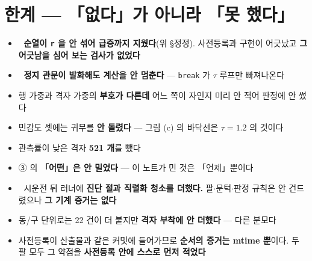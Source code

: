 \documentclass{article}
\begin{document}
\section{한계 --- 「없다」가 아니라 「못 했다」}

\begin{itemize}
\item 🔴 \textbf{순열이 \texttt{r} 을 안 섞어 급증까지 지웠다}(위 §정정).
      사전등록과 구현이 어긋났고 \textbf{그 어긋남을 심어 보는 검사가 없었다}
\item 🔴 \textbf{정지 관문이 발화해도 계산을 안 멈춘다} --- \texttt{break} 가 $\tau$ 루프만 빠져나온다
\item 행 가중과 격자 가중의 \textbf{부호가 다른데} 어느 쪽이 자인지 미리 안 적어 판정에 안 썼다
\item 민감도 셋에는 귀무를 \textbf{안 돌렸다} --- 그림 (c) 의 바닥선은 $\tau=1.2$ 의 것이다
\item 관측률이 낮은 격자 \textbf{521 개}를 뺐다
\item ③ 의 \textbf{「어떤」은 안 밀었다} --- 이 노트가 민 것은 「언제」뿐이다
\item 🔴 시운전 뒤 러너에 \textbf{진단 절과 직렬화 청소를 더했다.}
      팔$\cdot$문턱$\cdot$판정 규칙은 안 건드렸으나 \textbf{그 기계 증거는 없다}
\item 동/구 단위로는 22 건이 더 붙지만 \textbf{격자 부착에 안 더했다} --- 다른 분모다
\item 사전등록이 산출물과 같은 커밋에 들어가므로 \textbf{순서의 증거는 mtime 뿐}이다.
      두 팔 모두 그 약점을 \textbf{사전등록 안에 스스로 먼저 적었다}
\end{itemize}
\end{document}
